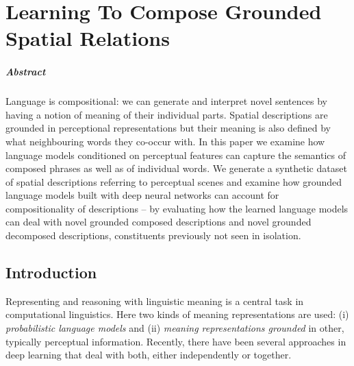 
\chapter{Learning To Compose Grounded Spatial Relations}

\paragraph{Abstract}
Language is compositional: we can generate and interpret novel sentences by
having a notion of meaning of their individual parts. Spatial descriptions are
grounded in perceptional representations but their meaning is also defined by
what neighbouring words they co-occur with.
In this paper we examine how language models conditioned on perceptual features
can capture the semantics of composed phrases as well as of individual words. We
generate a synthetic dataset of spatial descriptions referring to perceptual
scenes and examine how grounded language models built with deep neural
networks can account for compositionality of descriptions -- by evaluating how
the learned language models can deal with novel grounded composed descriptions and novel
grounded decomposed descriptions, constituents previously not seen in isolation.

\section{Introduction}
Representing and reasoning with linguistic meaning is a central task in
computational linguistics. Here two kinds of meaning representations are used:
(i) \emph{probabilistic language models} and
(ii) \emph{meaning representations grounded} in other, typically perceptual
information. Recently, there have been several approaches in deep learning that
deal with both, either independently or together.

